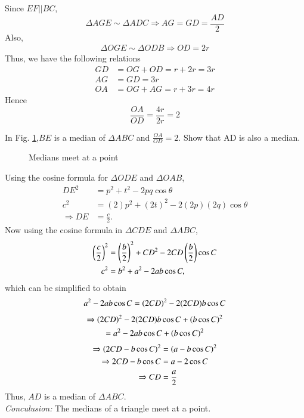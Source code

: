 \proof Since $EF || BC$,
%
\begin{equation}
\Delta AGE \sim \Delta ADC \Rightarrow AG = GD = \frac{AD}{2}
\end{equation}
%
Also,
\begin{align}
\Delta OGE \sim \Delta ODB \Rightarrow OD = 2r
\end{align}
Thus, we have the following relations
\begin{align}
GD &= OG + OD  = r + 2r = 3r\\
AG &= GD = 3r\\
OA &= OG + AG = r + 3r = 4r
\end{align}
Hence
%
\begin{equation}
\frac{OA}{OD} = \frac{4r}{2r} = 2
\end{equation}
%
%
\begin{problem}
	In Fig. \ref{ch2_median_final},$BE$ is a median of $\Delta ABC$ and $\frac{OA}{OD} = 2$.  Show that AD is also a median. 
\end{problem}
%
\begin{figure}[!h]
	\begin{center}
		
		\resizebox{\columnwidth}{!}{}
	\end{center}
	\caption{Medians meet at a point}
	\label{ch2_median_final}	
\end{figure}

\proof Using the cosine formula for $\Delta ODE$ and $\Delta OAB$, 
\begin{align}
DE^2 &= p^2 + t^2 -2pq\cos \theta \\
c^2 & = (2)p^2 + (2t)^2 -2(2p)(2q)\cos \theta \\
\Rightarrow DE &= \frac{c}{2}.
\end{align}
%
Now using the cosine formula in $\Delta CDE$ and $\Delta ABC$, 
\begin{align}
\left(\frac{c}{2}\right)^2 &= \left(\frac{b}{2}\right)^2 +CD^2 -2CD \left(\frac{b}{2}\right) \cos C\\
c^2 &= b^2 + a^2 -2 a b \cos C,
\end{align}
which can be simplified to obtain
%
\begin{align}
a^2 - 2ab \cos C = \left(2CD\right)^2 - 2(2CD)b  \cos C 
\end{align}
\begin{multline}
\Rightarrow  \left(2CD\right)^2 - 2(2CD)b  \cos C  + \left(b \cos C \right)^2 
\\
= a^2 - 2ab \cos C + \left(b \cos C \right)^2 
\end{multline}
\begin{align}
\Rightarrow \left(2CD - b\cos C\right)^2 &= \left(a - b\cos C\right)^2 \\
\Rightarrow 2CD - b\cos C &= a - 2\cos C \\
\Rightarrow CD &= \frac{a}{2}
\end{align}
%
Thus, $AD$ is a median of $\Delta ABC$.  
\\
%
{\em Conculusion:} The medians of a triangle meet at a point.